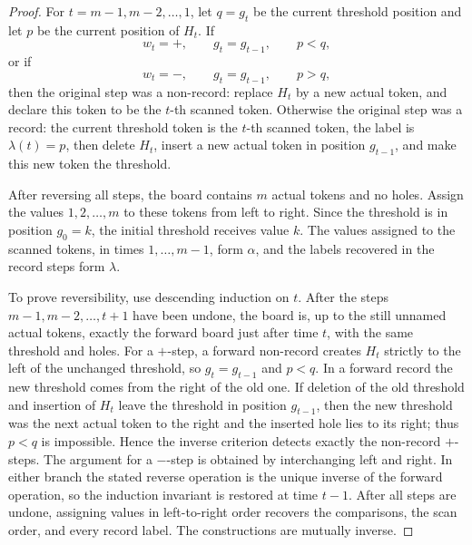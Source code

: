 \documentclass[11pt,letterpaper,reqno]{amsart}
\theoremstyle{definition}
\begin{document}
\begin{proof}
For \(t=m-1,m-2,\ldots,1\), let \(q=g_t\) be the current threshold position
and let \(p\) be the current position of \(H_t\).  If
\[
w_t=+,\qquad g_t=g_{t-1},\qquad p<q,
\]
or if
\[
w_t=-,\qquad g_t=g_{t-1},\qquad p>q,
\]
then the original step was a non-record: replace \(H_t\) by a new actual
token, and declare this token to be the \(t\)-th scanned token.  Otherwise the
original step was a record: the current threshold token is the \(t\)-th scanned
token, the label is $\lambda(t)=p$, then delete \(H_t\), insert a new actual token in position \(g_{t-1}\), and
make this new token the threshold.

After reversing all steps, the board contains \(m\) actual tokens and no holes.
Assign the values \(1,2,\ldots,m\) to these tokens from left to right.  Since
the threshold is in position \(g_0=k\), the initial threshold receives value
\(k\).  The values assigned to the scanned tokens, in times
\(1,\ldots,m-1\), form \(\alpha\), and the labels recovered in the record
steps form \(\lambda\).

To prove reversibility, use descending induction on \(t\).  After the steps
\(m-1,m-2,\ldots,t+1\) have been undone, the board is, up to the still unnamed
actual tokens, exactly the forward board just after time \(t\), with the same
threshold and holes.  For a \(+\)-step, a forward non-record creates \(H_t\)
strictly to the left of the unchanged threshold, so
\(g_t=g_{t-1}\) and \(p<q\).  In a forward record the new threshold comes from
the right of the old one.  If deletion of the old threshold and insertion of
\(H_t\) leave the threshold in position \(g_{t-1}\), then the new threshold
was the next actual token to the right and the inserted hole lies to its right;
thus \(p<q\) is impossible.  Hence the inverse criterion detects exactly the
non-record \(+\)-steps.  The argument for a \(-\)-step is obtained by
interchanging left and right.  In either branch the stated reverse operation
is the unique inverse of the forward operation, so the induction invariant is
restored at time \(t-1\).  After all steps are undone, assigning values in
left-to-right order recovers the comparisons, the scan order, and every record
label.  The constructions are mutually inverse.
\end{proof}
\end{document}

